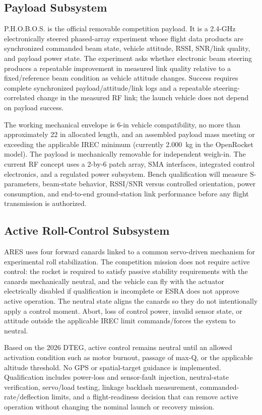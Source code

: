 \documentclass[10pt]{article}
\newcommand{\PHOBOS}{P.H.O.B.O.S.}
\begin{document}
\subsection{Payload Subsystem}
\PHOBOS{} is the official removable competition payload. It is a 2.4-GHz electronically steered phased-array experiment whose flight data products are synchronized commanded beam state, vehicle attitude, RSSI, SNR/link quality, and payload power state. The experiment asks whether electronic beam steering produces a repeatable improvement in measured link quality relative to a fixed/reference beam condition as vehicle attitude changes. Success requires complete synchronized payload/attitude/link logs and a repeatable steering-correlated change in the measured RF link; the launch vehicle does not depend on payload success.

The working mechanical envelope is 6-in vehicle compatibility, no more than approximately 22 in allocated length, and an assembled payload mass meeting or exceeding the applicable IREC minimum (currently \SI{2.000}{kg} in the OpenRocket model). The payload is mechanically removable for independent weigh-in. The current RF concept uses a 2-by-6 patch array, SMA interfaces, integrated control electronics, and a regulated power subsystem. Bench qualification will measure S-parameters, beam-state behavior, RSSI/SNR versus controlled orientation, power consumption, and end-to-end ground-station link performance before any flight transmission is authorized.

\subsection{Active Roll-Control Subsystem}
ARES uses four forward canards linked to a common servo-driven mechanism for experimental roll stabilization. The competition mission does not require active control: the rocket is required to satisfy passive stability requirements with the canards mechanically neutral, and the vehicle can fly with the actuator electrically disabled if qualification is incomplete or ESRA does not approve active operation. The neutral state aligns the canards so they do not intentionally apply a control moment. Abort, loss of control power, invalid sensor state, or attitude outside the applicable IREC limit commands/forces the system to neutral.

Based on the 2026 DTEG, active control remains neutral until an allowed activation condition such as motor burnout, passage of max-Q, or the applicable altitude threshold. No GPS or spatial-target guidance is implemented. Qualification includes power-loss and sensor-fault injection, neutral-state verification, servo/load testing, linkage backlash measurement, commanded-rate/deflection limits, and a flight-readiness decision that can remove active operation without changing the nominal launch or recovery mission.
\end{document}
